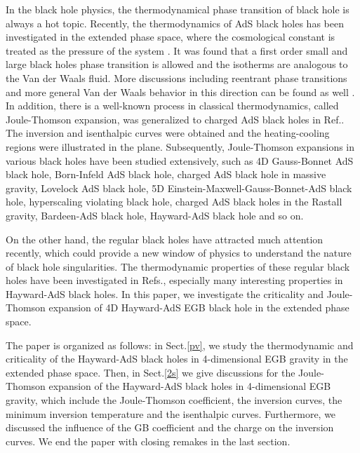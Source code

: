 \documentclass[aps,11pt]{revtex4}
\begin{document}
In the black hole physics, the thermodynamical phase transition of black hole is always a hot topic. Recently, the thermodynamics of AdS black holes has been investigated in the extended phase space, where the cosmological constant is treated as the pressure of the system \cite{Kastor:2009wy,Kubiznak:2012wp}.
It was found that a first order small and large black holes phase transition is allowed and the  isotherms are analogous to the Van der Waals fluid.
More discussions including reentrant phase transitions and more general Van der Waals behavior in this direction can be found as well \cite{Gunasekaran:2012dq,Hendi:2012um,Zhao:2013oza,Zou:2013owa,
Dehghani:2014caa,Hennigar:2015esa,Zhang:2014jfa,Altamirano:2014tva,
Wei:2015iwa,Xu:2014kwa,Sadeghi:2016dvc,Hansen:2016ayo}.
In addition, there is a well-known process in classical thermodynamics, called Joule-Thomson expansion, was generalized to charged AdS black holes in Ref.\cite{Okcu:2016tgt}. The inversion and isenthalpic curves were obtained and the heating-cooling regions were illustrated in the  plane. Subsequently, Joule-Thomson expansions in various black holes have been studied extensively, such as 4D Gauss-Bonnet AdS black hole\cite{Hegde:2020xlv}, Born-Infeld AdS black hole\cite{Bi:2020vcg}, charged AdS black hole in massive gravity\cite{Nam:2020gud}, Lovelock AdS black hole\cite{Mo:2018qkt}, 5D Einstein-Maxwell-Gauss-Bonnet-AdS black hole\cite{Haldar:2018cks}, hyperscaling violating black hole\cite{Sadeghi:2020bon}, charged AdS black holes in
the Rastall gravity\cite{Meng:2020csd}, Bardeen-AdS black hole\cite{Singh:2020xju,Li:2019jcd}, Hayward-AdS black hole\cite{Guo:2019gkr} and so on.

On the other hand, the regular black holes\cite{Bardeen:1968,Debnath:2015hea,Pourhassan:2016qoz,DeLorenzo:2014pta,Kumar:2020bqf} have attracted much attention recently, which could provide a new window of physics to understand the nature of black hole singularities. The thermodynamic properties of these regular black holes have been investigated in Refs.\cite{Flachi:2012nv,Abchouyeh:2013qca,Hayward:2005gi,Halilsoy:2013iza}, especially many interesting properties in Hayward-AdS black holes\cite{Guo:2019gkr,Abbas:2014oua,Rodrigue:2018lzp,Contreras:2018gpl}. In this paper, we investigate the  criticality and Joule-Thomson expansion of 4D Hayward-AdS EGB black hole in the extended phase space.

The paper is organized as follows: in Sect.\ref{pv}, we study the thermodynamic and  criticality of the Hayward-AdS black holes in 4-dimensional EGB gravity in the extended phase space. Then, in Sect.\ref{2s} we give discussions for the Joule-Thomson expansion of the Hayward-AdS black holes in 4-dimensional EGB gravity, which include the Joule-Thomson coefficient, the inversion curves, the minimum inversion temperature and the isenthalpic curves. Furthermore, we discussed the influence of the GB coefficient and the charge  on the inversion curves. We end the paper with closing remakes in the last section.
\end{document}
